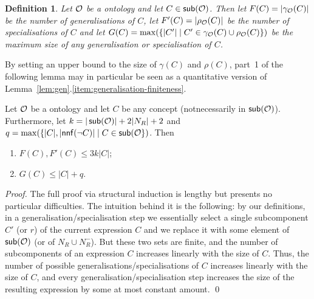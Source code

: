 \documentclass[
]{ceurart}
\newtheorem{definition}{Definition}
\begin{document}
\begin{definition}
  Let $\mathcal{O}$ be a \SROIQ ontology and let $C \in \mathop{\mathsf{sub}}(\mathcal{O})$. Then let $F(C) = |\gamma_\mathcal{O}(C)|$ be the number of generalisations of $C$, let $F'(C) = |\rho_\mathcal{O}(C)|$ be the number of specialisations of $C$ and let $G(C) = \max(\{|C'| \mid C' \in \gamma_\mathcal{O}(C) \cup \rho_\mathcal{O}(C)\})$ be the maximum size of any generalisation or specialisation of $C$. 
\end{definition}
By setting an upper bound to the size of $\gamma(C)$ and $\rho(C)$, part~1 of the following lemma may in particular be seen as a quantitative version  of Lemma~\ref{lem:gen}.\ref{item:generalisation-finiteness}.
\begin{lemma}\label{lem:refinement-set-size-bound}
 Let $\mathcal{O}$ be a \SROIQ ontology and let $C$ be any concept (not\linebreak necessarily in $\mathop{\mathsf{sub}}(\mathcal{O})$). Furthermore, let $k = |\mathop{\mathsf{sub}}(\mathcal{O})| + 2|N_R| + 2$ and $q = \max(\{|C|, |\mathsf{nnf}(\lnot C)| \mid C \in \mathop{\mathsf{sub}}(\mathcal{O}\})$. Then 
 \begin{enumerate}
     \item $F(C), F'(C) \leq 3k|C|$; 
     \item $G(C) \leq |C| + q$. 
 \end{enumerate}
\end{lemma}
\begin{proof}
The full proof via structural induction is lengthy but presents no particular difficulties. The intuition behind it is the following: by our definitions, in a generalisation/specialisation step we essentially select a single subcomponent $C'$ (or $r$) of the current expression $C$ and we replace it with some element of $\mathop{\mathsf{sub}}(\mathcal{O})$  (or of $N_R \cup N_R^-$). But these two sets are finite, and the number of subcomponents of an expression $C$ increases linearly with the size of $C$. Thus, the number of possible generalisations/specialisations of $C$ increases linearly with the size  of  $C$, and every generalisation/specialisation step increases the size of the resulting expression by some at most constant amount. 
\qed\end{proof}
\end{document}
